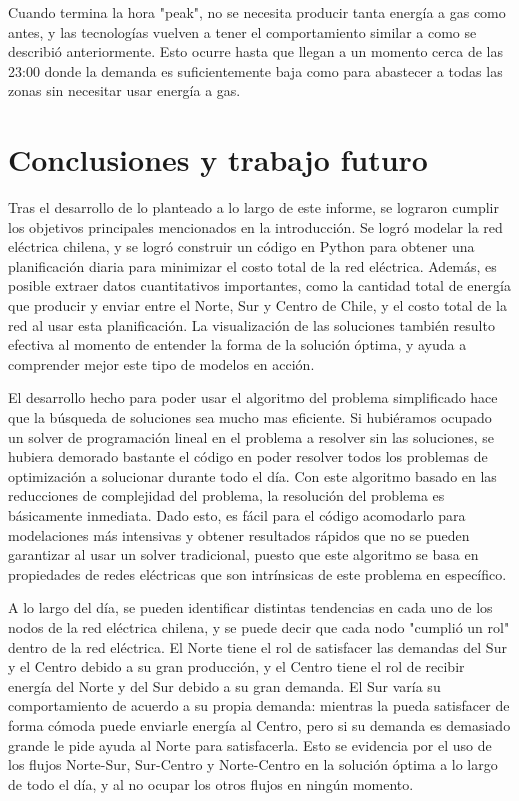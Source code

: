 \documentclass[12pt,twoside]{article}
\begin{document}
	\hspace{1cm} Cuando termina la hora "peak", no se necesita producir tanta energ\'ia a gas como antes, y las tecnolog\'ias vuelven a tener el comportamiento similar a como se describi\'o anteriormente. Esto ocurre hasta que llegan a un momento cerca de las 23:00 donde la demanda es suficientemente baja como para abastecer a todas las zonas sin necesitar usar energ\'ia a gas.

	\section{Conclusiones y trabajo futuro}
	\hspace{1cm} Tras el desarrollo de lo planteado a lo largo de este informe, se lograron cumplir los objetivos principales mencionados en la introducci\'on. Se logr\'o modelar la red el\'ectrica chilena, y se logr\'o construir un c\'odigo en Python para obtener una planificaci\'on diaria para minimizar el costo total de la red el\'ectrica. Adem\'as, es posible extraer datos cuantitativos importantes, como la cantidad total de energ\'ia que producir y enviar entre el Norte, Sur y Centro de Chile, y el costo total de la red al usar esta planificaci\'on. La visualizaci\'on de las soluciones tambi\'en resulto efectiva al momento de entender la forma de la soluci\'on \'optima, y ayuda a comprender mejor este tipo de modelos en acci\'on.
	
	\hspace{1cm} El desarrollo hecho para poder usar el algoritmo del problema simplificado hace que la b\'usqueda de soluciones sea mucho mas eficiente. Si hubi\'eramos ocupado un solver de programaci\'on lineal en el problema a resolver sin las soluciones, se hubiera demorado bastante el c\'odigo en poder resolver todos los problemas de optimizaci\'on a solucionar durante todo el d\'ia. Con este algoritmo basado en las reducciones de complejidad del problema, la resoluci\'on del problema es b\'asicamente inmediata. Dado esto, es f\'acil para el c\'odigo acomodarlo para modelaciones m\'as intensivas y obtener resultados r\'apidos que no se pueden garantizar al usar un solver tradicional, puesto que este algoritmo se basa en propiedades de redes el\'ectricas que son intr\'insicas de este problema en espec\'ifico.
	
	\hspace{1cm} A lo largo del d\'ia, se pueden identificar distintas tendencias en cada uno de los nodos de la red el\'ectrica chilena, y se puede decir que cada nodo "cumpli\'o un rol" dentro de la red el\'ectrica. El Norte tiene el rol de satisfacer las demandas del Sur y el Centro debido a su gran producci\'on, y el Centro tiene el rol de recibir energ\'ia del Norte y del Sur debido a su gran demanda. El Sur var\'ia su comportamiento de acuerdo a su propia demanda: mientras la pueda satisfacer de forma c\'omoda puede enviarle energ\'ia al Centro, pero si su demanda es demasiado grande le pide ayuda al Norte para satisfacerla. Esto se evidencia por el uso de los flujos Norte-Sur, Sur-Centro y Norte-Centro en la soluci\'on \'optima a lo largo de todo el d\'ia, y al no ocupar los otros flujos en ning\'un momento.
	
\end{document}
